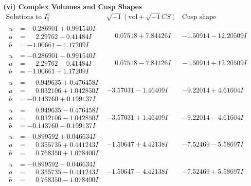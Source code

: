 \documentclass[1p]{elsarticle_modified}
\theoremstyle{definition}
\newcommand{\I}{\sqrt{-1}}
\begin{document}
\newpage\flushleft \textbf{(vi) Complex Volumes and Cusp Shapes}
$$\begin{array}{c|c|c}  
\text{Solutions to }I^u_{2}& \I (\text{vol} + \sqrt{-1}CS) & \text{Cusp shape}\\
 \hline 
\begin{aligned}
u &= -0.286901 + 0.991540 I \\
a &= \phantom{-}2.29762 + 0.41484 I \\
b &= -1.00661 - 1.17209 I\end{aligned}
 & \phantom{-}0.07518 + 7.84426 I & -1.50914 - 12.20509 I \\ \hline\begin{aligned}
u &= -0.286901 - 0.991540 I \\
a &= \phantom{-}2.29762 - 0.41484 I \\
b &= -1.00661 + 1.17209 I\end{aligned}
 & \phantom{-}0.07518 - 7.84426 I & -1.50914 + 12.20509 I \\ \hline\begin{aligned}
u &= \phantom{-}0.949635 + 0.476458 I \\
a &= \phantom{-}0.032106 + 1.042850 I \\
b &= -0.143760 + 0.199137 I\end{aligned}
 & -3.57031 - 1.46409 I & -9.22014 + 4.61604 I \\ \hline\begin{aligned}
u &= \phantom{-}0.949635 - 0.476458 I \\
a &= \phantom{-}0.032106 - 1.042850 I \\
b &= -0.143760 - 0.199137 I\end{aligned}
 & -3.57031 + 1.46409 I & -9.22014 - 4.61604 I \\ \hline\begin{aligned}
u &= -0.899592 + 0.046634 I \\
a &= \phantom{-}0.355735 + 0.441243 I \\
b &= \phantom{-}0.768350 + 1.078400 I\end{aligned}
 & -1.50647 + 4.42138 I & -7.52469 - 5.58697 I \\ \hline\begin{aligned}
u &= -0.899592 - 0.046634 I \\
a &= \phantom{-}0.355735 - 0.441243 I \\
b &= \phantom{-}0.768350 - 1.078400 I\end{aligned}
 & -1.50647 - 4.42138 I & -7.52469 + 5.58697 I \\ \hline\begin{aligned}

\end{aligned}
\end{array}$$
\end{document}
